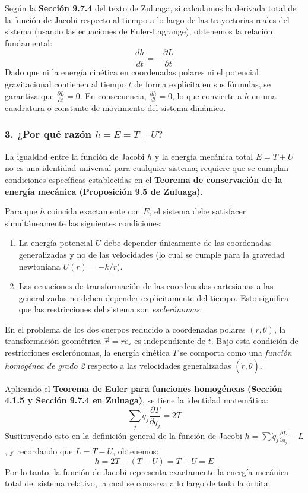 \documentclass[a4paper]{article}
\begin{document}
Según la \textbf{Sección 9.7.4} del texto de Zuluaga, si calculamos la derivada total de la función de Jacobi respecto al tiempo a lo largo de las trayectorias reales del sistema (usando las ecuaciones de Euler-Lagrange), obtenemos la relación fundamental:
$$ \frac{dh}{dt} = -\frac{\partial L}{\partial t} $$
Dado que ni la energía cinética en coordenadas polares ni el potencial gravitacional contienen al tiempo $t$ de forma explícita en sus fórmulas, se garantiza que $\frac{\partial L}{\partial t} = 0$. En consecuencia, $\frac{dh}{dt} = 0$, lo que convierte a $h$ en una cuadratura o constante de movimiento del sistema dinámico.

\subsubsection*{3. ¿Por qué razón $h=E=T+U$?}
La igualdad entre la función de Jacobi $h$ y la energía mecánica total $E = T + U$ no es una identidad universal para cualquier sistema; requiere que se cumplan condiciones específicas establecidas en el \textbf{Teorema de conservación de la energía mecánica (Proposición 9.5 de Zuluaga)}. 

Para que $h$ coincida exactamente con $E$, el sistema debe satisfacer simultáneamente las siguientes condiciones:
\begin{enumerate}
    \item La energía potencial $U$ debe depender únicamente de las coordenadas generalizadas y no de las velocidades (lo cual se cumple para la gravedad newtoniana $U(r) = -k/r$).
    \item Las ecuaciones de transformación de las coordenadas cartesianas a las generalizadas no deben depender explícitamente del tiempo. Esto significa que las restricciones del sistema son \textit{esclerónomas}.
\end{enumerate}

En el problema de los dos cuerpos reducido a coordenadas polares $(r, \theta)$, la transformación geométrica $\vec{r} = r\hat{e}_r$ es independiente de $t$. Bajo esta condición de restricciones esclerónomas, la energía cinética $T$ se comporta como una \textit{función homogénea de grado 2} respecto a las velocidades generalizadas $(\dot{r}, \dot{\theta})$. 

Aplicando el \textbf{Teorema de Euler para funciones homogéneas (Sección 4.1.5 y Sección 9.7.4 en Zuluaga)}, se tiene la identidad matemática:
$$ \sum_j \dot{q}_j \frac{\partial T}{\partial \dot{q}_j} = 2T $$
Sustituyendo esto en la definición general de la función de Jacobi $h = \sum \dot{q}_j \frac{\partial L}{\partial \dot{q}_j} - L$, y recordando que $L = T - U$, obtenemos:
$$ h = 2T - (T - U) = T + U = E $$
Por lo tanto, la función de Jacobi representa exactamente la energía mecánica total del sistema relativo, la cual se conserva a lo largo de toda la órbita.
\end{document}
